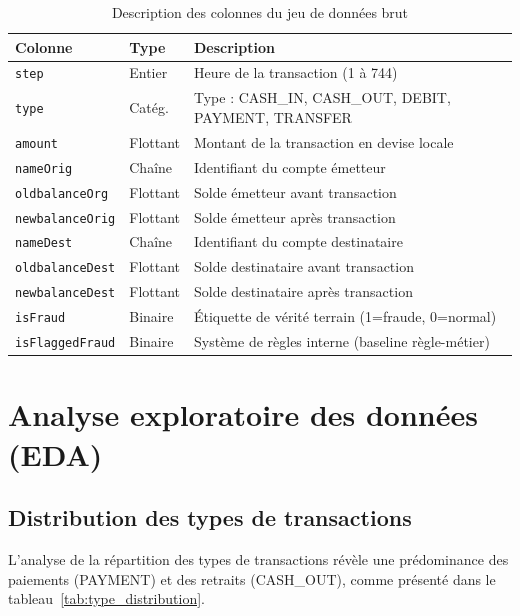 \documentclass[12pt,a4paper,twoside]{report}
\theoremstyle{definition}
\begin{document}
\begin{table}[H]
\centering
\caption{Description des colonnes du jeu de données brut}
\label{tab:columns}
\renewcommand{\arraystretch}{1.3}
\begin{tabularx}{\textwidth}{L{3.5cm}C{1.8cm}L{7.7cm}}
\toprule
\textbf{Colonne} & \textbf{Type} & \textbf{Description} \\
\midrule
\texttt{step}        & Entier  & Heure de la transaction (1 à 744) \\
\texttt{type}        & Catég.  & Type : CASH\_IN, CASH\_OUT, DEBIT, PAYMENT, TRANSFER \\
\texttt{amount}      & Flottant & Montant de la transaction en devise locale \\
\texttt{nameOrig}    & Chaîne  & Identifiant du compte émetteur \\
\texttt{oldbalanceOrg} & Flottant & Solde émetteur avant transaction \\
\texttt{newbalanceOrig} & Flottant & Solde émetteur après transaction \\
\texttt{nameDest}    & Chaîne  & Identifiant du compte destinataire \\
\texttt{oldbalanceDest} & Flottant & Solde destinataire avant transaction \\
\texttt{newbalanceDest} & Flottant & Solde destinataire après transaction \\
\texttt{isFraud}     & Binaire  & Étiquette de vérité terrain (1=fraude, 0=normal) \\
\texttt{isFlaggedFraud} & Binaire & Système de règles interne (baseline règle-métier) \\
\bottomrule
\end{tabularx}
\end{table}

\section{Analyse exploratoire des données (EDA)}

\subsection{Distribution des types de transactions}

L'analyse de la répartition des types de transactions révèle une prédominance
des paiements (PAYMENT) et des retraits (CASH\_OUT), comme présenté dans le
tableau~\ref{tab:type_distribution}.
\end{document}
